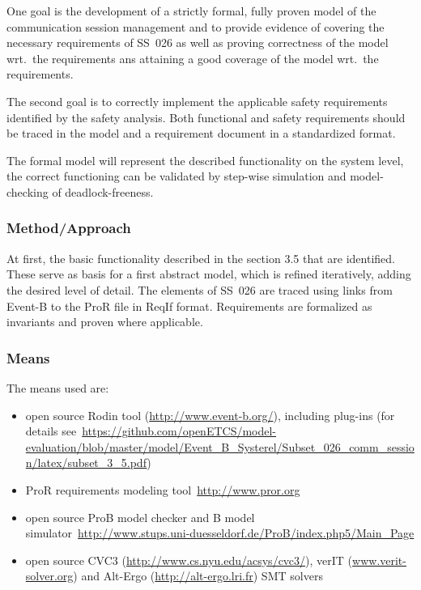 \documentclass{article}
\begin{document}
One goal is the development of a strictly formal, fully proven model of the
communication session management and to provide evidence of covering the
necessary requirements of SS~026 as well as proving correctness of the model
wrt.\ the requirements ans attaining a good coverage of the model wrt.\ the
requirements.

The second goal is to correctly implement the applicable safety requirements
identified by the safety analysis. Both functional and safety requirements
should be traced in the model and a requirement document in a standardized
format.

The formal model will represent the described functionality on the system level,
the correct functioning can be validated by step-wise simulation and
model-checking of deadlock-freeness.


\subsubsection{Method/Approach}
\label{sec:methodapproach}

At first, the basic functionality described in the section 3.5 that are
identified. These serve as basis for a first abstract model, which is refined
iteratively, adding the desired level of detail. The elements of SS~026 are
traced using links from Event-B to the ProR file in ReqIf format. Requirements
are formalized as invariants and proven where applicable.

\subsubsection{Means}
\label{sec:means}

The means used are:
\begin{itemize}
\item open source Rodin tool (\url{http://www.event-b.org/}), including plug-ins
  (for details
  see~\url{https://github.com/openETCS/model-evaluation/blob/master/model/Event_B_Systerel/Subset_026_comm_session/latex/subset_3_5.pdf})
\item ProR requirements modeling tool~\url{http://www.pror.org}
\item open source ProB model checker and B model
  simulator~\url{http://www.stups.uni-duesseldorf.de/ProB/index.php5/Main_Page}
\item open source CVC3 (\url{http://www.cs.nyu.edu/acsys/cvc3/}), verIT
  (\url{www.verit-solver.org}) and Alt-Ergo (\url{http://alt-ergo.lri.fr}) SMT
  solvers
\end{itemize}
\end{document}
